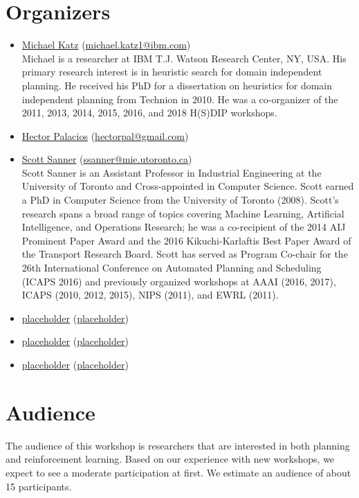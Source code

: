 \documentclass[10pt]{article}
\begin{document}
\section*{Organizers}

\begin{itemize}



\item \href{https://resedit.watson.ibm.com/researcher/view.php?person=ibm-Michael.Katz1}{Michael Katz}
 (\href{mailto:michael.katz1@ibm.com}{michael.katz1@ibm.com})\\
 Michael is a researcher at IBM T.J. Watson Research Center, NY, USA. His
 primary research interest is in heuristic search for domain independent planning.
 He received his PhD for a dissertation on heuristics for domain independent
 planning from Technion in 2010.
 He was a co-organizer of the 2011, 2013, 2014, 2015, 2016, and 2018 H(S)DIP
 workshops.


\item \href{http://hectorpalacios.net/}{Hector Palacios}
  (\href{mailto:hectorpal@gmail.com}{hectorpal@gmail.com})\\

\item \href{http://d3m.mie.utoronto.ca}{Scott Sanner}
  (\href{mailto:ssanner@mie.utoronto.ca}{ssanner@mie.utoronto.ca})\\
Scott Sanner is an Assistant Professor in Industrial Engineering at the
University of Toronto and Cross-appointed in Computer Science.  Scott earned a
PhD in Computer Science from the University of Toronto (2008).  Scott’s research
spans a broad range of topics covering Machine Learning, Artificial
Intelligence, and Operations Research; he was a co-recipient of the 2014 AIJ
Prominent Paper Award and the 2016 Kikuchi-Karlaftis Best Paper Award of the
Transport Research Board.  Scott has served as Program Co-chair for the 26th
International Conference on Automated Planning and Scheduling (ICAPS 2016) and
previously organized workshops at AAAI (2016, 2017), ICAPS (2010, 2012, 2015),
NIPS (2011), and EWRL (2011).
  


\item \href{placeholder}{placeholder}
  (\href{mailto:placeholder}{placeholder})\\

\item \href{placeholder}{placeholder}
  (\href{mailto:placeholder}{placeholder})\\

\item \href{placeholder}{placeholder}
  (\href{mailto:placeholder}{placeholder})\\

  
\end{itemize}

\section*{Audience}

The audience of this workshop is researchers that are interested in both
planning and reinforcement learning.
%
Based on our experience with new workshops, we expect to see a moderate
participation at first. We estimate an audience of about 15 participants.  
\end{document}
